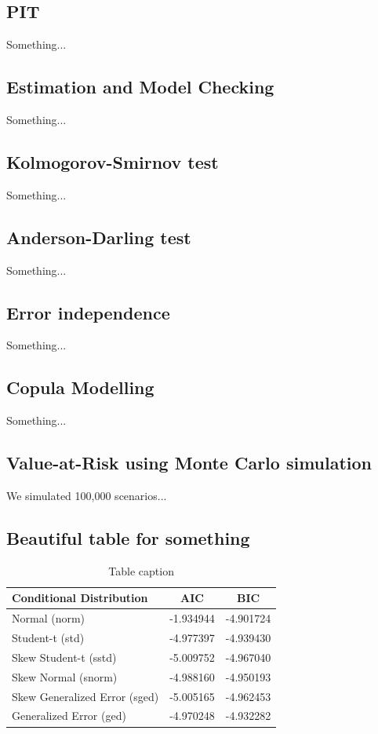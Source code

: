 \documentclass[a4paper,10pt]{article}
\begin{document}
\subsection{PIT}
Something...

\subsection{Estimation and Model Checking}
Something...

\subsection{Kolmogorov-Smirnov test}
Something...

\subsection{Anderson-Darling test}
Something...

\subsection{Error independence}
Something...

\subsection{Copula Modelling}
Something...

\subsection{Value-at-Risk using Monte Carlo simulation}
We simulated 100,000 scenarios...

\subsection{Beautiful table for something}
\begin{table}[h]
    \centering
    \caption{Table caption}
    \label{tab:dist}
    \begin{tabular}{lcc}
        \toprule
        Conditional Distribution & AIC & BIC \\
        \midrule
        Normal (norm) & -1.934944 & -4.901724 \\
        Student-t (std) & -4.977397 & -4.939430 \\
        Skew Student-t (sstd) & -5.009752 & -4.967040 \\
        Skew Normal (snorm) & -4.988160 & -4.950193 \\
        Skew Generalized Error (sged) & -5.005165 & -4.962453 \\
        Generalized Error (ged) & -4.970248 & -4.932282 \\
        \bottomrule
    \end{tabular}
\end{table}
\end{document}
